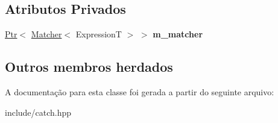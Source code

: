 \subsection*{Atributos Privados}
\begin{DoxyCompactItemize}
\item 
\hyperlink{classCatch_1_1Ptr}{Ptr}$<$ \hyperlink{structCatch_1_1Matchers_1_1Impl_1_1Matcher}{Matcher}$<$ ExpressionT $>$ $>$ {\bfseries m\+\_\+matcher}\hypertarget{classCatch_1_1Matchers_1_1Impl_1_1Generic_1_1Not_ac87d2da92e5f927d39e02c686c870fb3}{}\label{classCatch_1_1Matchers_1_1Impl_1_1Generic_1_1Not_ac87d2da92e5f927d39e02c686c870fb3}

\end{DoxyCompactItemize}
\subsection*{Outros membros herdados}


A documentação para esta classe foi gerada a partir do seguinte arquivo\+:\begin{DoxyCompactItemize}
\item 
include/catch.\+hpp\end{DoxyCompactItemize}
